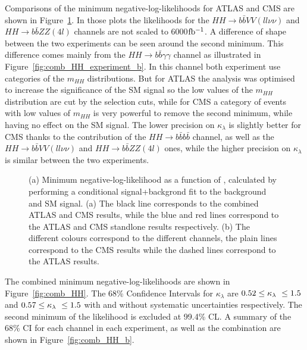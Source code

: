 Comparisons of the minimum negative-log-likelihoods for ATLAS and CMS are shown in Figure~\ref{fig:comb_HH_experiment}. In those plots the likelihoods for the $HH \rightarrow b\bar{b}VV(ll\nu\nu)$ and $HH \rightarrow b\bar{b}ZZ(4l)$ channels are not scaled to 6000$\mbox{fb$^{-1}$}$.
A difference of shape between the two experiments can be seen around the second minimum. This difference comes mainly from the $HH \rightarrow b\bar{b}\gamma\gamma$ channel as illustrated in Figure~\ref{fig:comb_HH_experiment_b}. In this channel both experiment use categories of the $m_{HH}$ distributions. But for ATLAS the analysis was optimised to increase the significance of the SM signal so the low values of the $m_{HH}$ distribution are cut by the selection cuts, while for CMS a category of events with low values of $m_{HH}$ is very powerful to remove the second minimum, while having no effect on the SM signal.
The lower precision on $\kappa_{\lambda}$ is slightly better for CMS thanks to the contribution of the $HH \rightarrow b\bar{b}b\bar{b}$ channel, as well as the $HH \rightarrow b\bar{b}VV(ll\nu\nu)$ and $HH \rightarrow b\bar{b}ZZ(4l)$ ones, while the higher precision on $\kappa_{\lambda}$ is similar between the two experiments.

\begin{figure}[!htb]
\centering 
{} 
\caption{(a) Minimum negative-log-likelihood as a function of \kl, calculated by performing a conditional signal+backgrond fit to the background and SM signal. (a) The black line corresponds to the combined ATLAS and CMS results, while the blue and red lines correspond to the ATLAS and CMS standlone results respectively. (b) The different colours correspond to the different channels, the plain lines correspond to the CMS results while the dashed lines correspond to the ATLAS results.} 
\label{fig:comb_HH_experiment} 
\end{figure}

The combined minimum negative-log-likelihoods are shown in Figure~\ref{fig:comb_HH}. 
The 68\% Confidence Intervals for $\kappa_{\lambda}$ are $0.52 \leq \kappa_{\lambda}\ \leq 1.5$ and $0.57 \leq \kappa_{\lambda}\ \leq 1.5$ with and without systematic uncertainties respectively. The second minimum of the likelihood is excluded at 99.4\% CL. A summary of the 68\% CI for each channel in each experiment, as well as the combination are shown in Figure~\ref{fig:comb_HH_b}.

